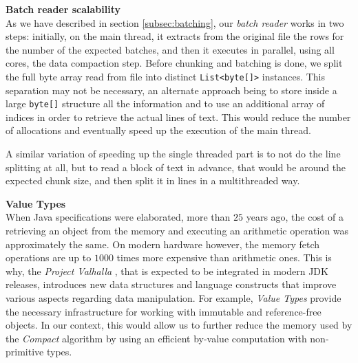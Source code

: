 \documentclass[a4paper,twoside]{article}
\begin{document}
{\textbf{Batch reader scalability} \\
As we have described in section \ref{subsec:batching}, our {\textit{batch reader} } works in two steps: initially, on the main thread, it extracts from the original file the rows for the number of the expected batches, and then it executes in parallel, using all cores, the data compaction step.
Before chunking and batching is done, we split the full byte array read from file into distinct  \texttt{List<byte[]>} instances.
This separation may not be necessary, an alternate approach being to store inside a large \texttt{byte[]} structure all the information and to use an additional array of indices in order to retrieve the actual lines of text.
This would reduce the number of allocations and eventually speed up the execution of the main thread.

A similar variation of speeding up the single threaded part is to not do the line splitting at all, but to read a block of text in advance, that would be around the expected chunk size,
and then split it in lines in a multithreaded way.

\textbf{Value Types} \\
When Java specifications were elaborated, more than $25$ years ago, the cost of a retrieving an object from the memory and executing an arithmetic operation was approximately the same.
On modern hardware however, the memory fetch operations are up to $1000$ times more expensive than arithmetic ones.
This is why, the {\textit{Project Valhalla} } \cite{jdk:valhalla}, that is expected to be integrated in modern JDK releases, introduces new data structures and language constructs that improve various aspects regarding data manipulation.
For example, {\textit{Value Types} } provide the necessary infrastructure for working with immutable and reference-free objects.
In our context, this would allow us to further reduce the memory used by the {\textit{Compact} } algorithm by using an efficient by-value computation with non-primitive types.

}
\end{document}
